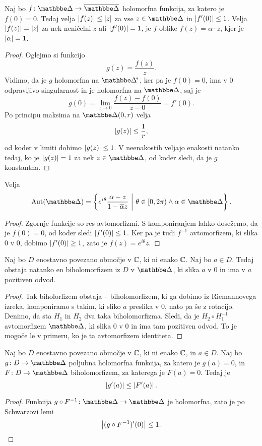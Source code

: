 \begin{trditev}
Naj bo $f \colon \dsk \to \oline{\dsk}$ holomorfna funkcija, za
katero je $f(0) = 0$. Tedaj velja $\left\lvert f(z)\right\rvert \leq \left\lvert z\right\rvert$ za vse
$z \in \dsk$ in $\left\lvert f'(0)\right\rvert \leq 1$. Velja $\left\lvert f(z)\right\rvert = \left\lvert z\right\rvert$
za nek neničelni $z$ ali $\left\lvert f'(0)\right\rvert = 1$, je $f$ oblike
$f(z) = \alpha \cdot z$, kjer je $\left\lvert \alpha\right\rvert = 1$.
\end{trditev}

\begin{proof}
Oglejmo si funkcijo
\[
g(z) = \frac{f(z)}{z}.
\]
Vidimo, da je $g$ holomorfna na $\dskx$, ker pa je $f(0) = 0$, ima
v $0$ odpravljivo singularnost in je holomorfna na $\dsk$, saj je
\[
g(0) = \lim_{z \to 0} \frac{f(z) - f(0)}{z - 0} = f'(0).
\]
Po principu maksima na $\dsk(0, r)$ velja
\[
\left\lvert g(z)\right\rvert \leq \frac{1}{r},
\]
od koder v limiti dobimo $\left\lvert g(z)\right\rvert \leq 1$. V neenakostih veljajo
enakosti natanko tedaj, ko je $\left\lvert g(z)\right\rvert = 1$ za nek $z \in \dsk$,
od koder sledi, da je $g$ konstantna.
\end{proof}

\begin{izrek}
Velja
\[
\Aut(\dsk) =
\setb{e^{i \theta} \frac{\alpha - z}{1 - \oline{\alpha} z}}
{\theta \in [0, 2 \pi) \land \alpha \in \dsk}.
\]
\end{izrek}

\begin{proof}
Zgornje funkcije so res avtomorfizmi. S komponiranjem lahko
dosežemo, da je $f(0) = 0$, od koder sledi $\left\lvert f'(0)\right\rvert \leq 1$.
Ker pa je tudi $f^{-1}$ avtomorfizem, ki slika $0$ v $0$, dobimo
$\left\lvert f'(0)\right\rvert \geq 1$, zato je $f(z) = e^{i \theta} z$.
\end{proof}

\begin{trditev}
Naj bo $D$ enostavno povezano območje v $\mathbb{C}$, ki ni enako $\mathbb{C}$. Naj
bo $a \in D$. Tedaj obstaja natanko en biholomorfizem iz $D$ v
$\dsk$, ki slika $a$ v $0$ in ima v $a$ pozitiven odvod.
\end{trditev}

\begin{proof}
Tak biholorfizem obstaja -- biholomorfizem, ki ga dobimo iz
Riemannovega izreka, komponiramo s takim, ki sliko $a$ preslika v
$0$, nato pa še z rotacijo. Denimo, da sta $H_1$ in $H_2$ dva taka
biholomorfizma. Sledi, da je $H_2 \circ H_1^{-1}$ avtomorfizem
$\dsk$, ki slika $0$ v $0$ in ima tam pozitiven odvod. To je mogoče
le v primeru, ko je ta avtomorfizem identiteta.
\end{proof}

\begin{trditev}
Naj bo $D$ enostavno povezano območje v $\mathbb{C}$, ki ni enako $\mathbb{C}$, in
$a \in D$. Naj bo $g \colon D \to \dsk$ poljubna holomorfna
funkcija, za katero je $g(a) = 0$, in $F \colon D \to \dsk$
biholomorfizem, za katerega je $F(a) = 0$. Tedaj je
\[
\left\lvert g'(a)\right\rvert \leq \left\lvert F'(a)\right\rvert.
\]
\end{trditev}

\begin{proof}
Funkcija $g \circ F^{-1} \colon \dsk \to \dsk$ je holomorfna, zato
je po Schwarzovi lemi
\[
\left\lvert (g \circ F^{-1})'(0)\right\rvert \leq 1. \qedhere
\]
\end{proof}
